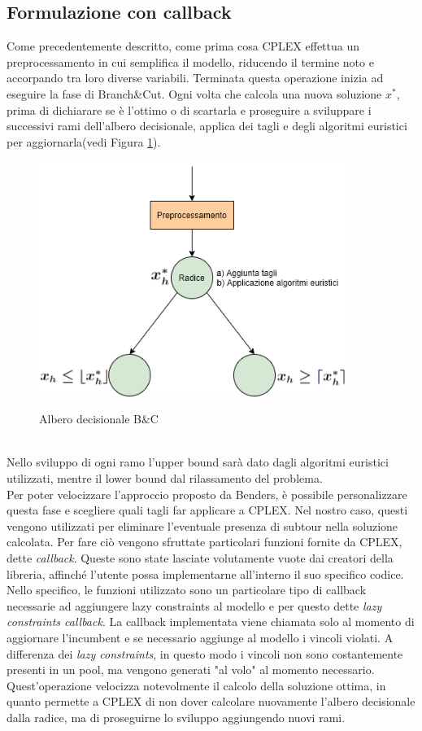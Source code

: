 \subsection{Formulazione con callback}
Come precedentemente descritto, come prima cosa CPLEX effettua un preprocessamento in cui semplifica il modello, riducendo il termine noto e accorpando tra loro diverse variabili. Terminata questa operazione inizia ad eseguire la fase di Branch\&Cut. Ogni volta che calcola una nuova soluzione $x^*$, prima di dichiarare se è l'ottimo o di scartarla e proseguire a sviluppare i successivi rami dell'albero decisionale, applica dei tagli e degli algoritmi euristici per aggiornarla(vedi Figura \ref{Albero_decisionale}).
\begin{figure}[h] 
\begin{center} 
  \includegraphics[width=10cm]{Images/albero_decisionale}\\ 
  \caption{\footnotesize{Albero decisionale B\&C}}
  \label{Albero_decisionale} 
\end{center} 
\end{figure}
\\Nello sviluppo di ogni ramo l'upper bound sarà dato dagli algoritmi euristici utilizzati, mentre il lower bound dal rilassamento del problema.\\ 
Per poter velocizzare l'approccio proposto da Benders, è possibile personalizzare questa fase e scegliere quali tagli far applicare a CPLEX. Nel nostro caso, questi vengono utilizzati per eliminare l'eventuale presenza di subtour nella soluzione calcolata. Per fare ciò vengono sfruttate particolari funzioni fornite da CPLEX, dette \textit{callback}. Queste sono state lasciate volutamente vuote dai creatori della libreria, affinché l'utente possa implementarne all'interno il suo specifico codice. Nello specifico, le funzioni utilizzato sono un particolare tipo di callback necessarie ad aggiungere lazy constraints al modello e per questo dette \textit{lazy constraints callback}. La callback implementata viene chiamata solo al momento di aggiornare l'incumbent e se necessario aggiunge al modello i vincoli violati. A differenza dei \textit{lazy constraints}, in questo modo i vincoli non sono costantemente presenti in un pool, ma vengono generati "al volo" al momento necessario.  Quest'operazione velocizza notevolmente il calcolo della soluzione ottima, in quanto permette a CPLEX di non dover calcolare nuovamente l'albero decisionale dalla radice, ma di proseguirne lo sviluppo aggiungendo nuovi rami.


